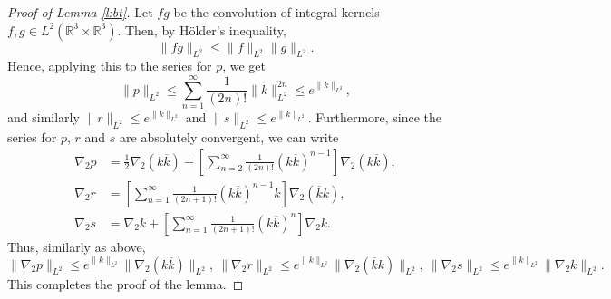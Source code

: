 \documentclass[11pt,a4paper,draft,DIV11]{scrartcl}	%
\newcommand{\Rbb}{\mathbb{R}}		%
\begin{document}
\begin{proof}[Proof of Lemma \ref{l:bt}]
  Let $fg$ be the convolution of integral kernels $f, g \in L^2(\Rbb^3\times\Rbb^3)$. Then, by H\"older's inequality,
  \[
    \| f g \|_{L^2} \le \| f \|_{L^2} \| g \|_{L^2}.
  \]
  Hence, applying this to the series for $p$, we get
  \[
    \| p \|_{L^2} \le \sum_{n=1}^\infty \frac{1}{(2n)!} \| k \|_{L^2}^{2n} \le
    e^{\| k \|_{L^2}},
  \]
  and similarly $\| r \|_{L^2} \le e^{\| k \|_{L^2}}$ and $\| s \|_{L^2} \le
  e^{\| k \|_{L^2}}$. Furthermore, since the series for $p$, $r$ and $s$ are
  absolutely convergent, we can write
  \begin{align*}
    \nabla_2 p & = \frac{1}{2} \nabla_2 (k \overline{k}) + \left[
    \sum_{n=2}^\infty \frac{1}{(2n)!} (k \overline{k})^{n-1} \right]
    \nabla_2 (k \overline{k}) , \\
    \nabla_2 r & = \left[ \sum_{n=1}^\infty \frac{1}{(2n+1)!} (k
    \overline{k})^{n-1} k \right] \nabla_2 (\overline{k} k), \\
    \nabla_2 s & = \nabla_2 k + \left[ \sum_{n=1}^\infty \frac{1}{(2n+1)!}
    (k \overline{k})^n \right] \nabla_2 k.
  \end{align*}
  Thus, similarly as above,
  \begin{displaymath}
    \| \nabla_2 p \|_{L^2} \le e^{\| k \|_{L^2}} \| \nabla_2 (k
    \overline{k}) \|_{L^2},\  
    \| \nabla_2 r \|_{L^2} \le e^{\| k \|_{L^2}} \| \nabla_2
    (\overline{k} k) \|_{L^2},\ 
    \| \nabla_2 s \|_{L^2} \le e^{\| k \|_{L^2}} \| \nabla_2 k
    \|_{L^2}.
  \end{displaymath}
This completes the proof of the lemma.
\end{proof}
\end{document}

